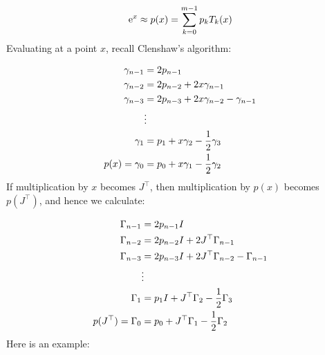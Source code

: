 \documentclass[12pt,a4paper]{article}
\def\half{ {1 \over 2} }
\def\E{ {\rm e} }
\begin{document}
\[
\E^x  \approx p(x) = \sum_{k=0}^{m-1} p_k T_k(x)
\]
Evaluating at a point $x$, recall Clenshaw's algorithm:


\begin{align*}
\gamma_{n-1} &= 2p_{n-1} \\
\gamma_{n-2} &= 2p_{n-2} + 2x \gamma_{n-1} \\
\gamma_{n-3} &= 2 p_{n-3} + 2x \gamma_{n-2} - \gamma_{n-1} \\
& \vdots \\
\gamma_1 &= p_1 + x \gamma_2 - \half \gamma_3 \\
p(x) = \gamma_0 &= p_0 + x \gamma_1 - \half \gamma_2
\end{align*}
If multiplication by $x$ becomes $J^\top$, then multiplication by $p(x)$ becomes $p(J^\top)$, and hence we calculate:


\begin{align*}
\Gamma_{n-1} &= 2p_{n-1}I \\
\Gamma_{n-2} &= 2p_{n-2}I + 2J^\top \Gamma_{n-1} \\
\Gamma_{n-3} &= 2 p_{n-3}I + 2J^\top \Gamma_{n-2} - \Gamma_{n-1} \\
& \vdots \\
\Gamma_1 &= p_1I + J^\top \Gamma_2 - \half \Gamma_3 \\
p(J^\top) = \Gamma_0 &= p_0 + J^\top \Gamma_1 - \half \Gamma_2
\end{align*}
Here is an example:
\end{document}
